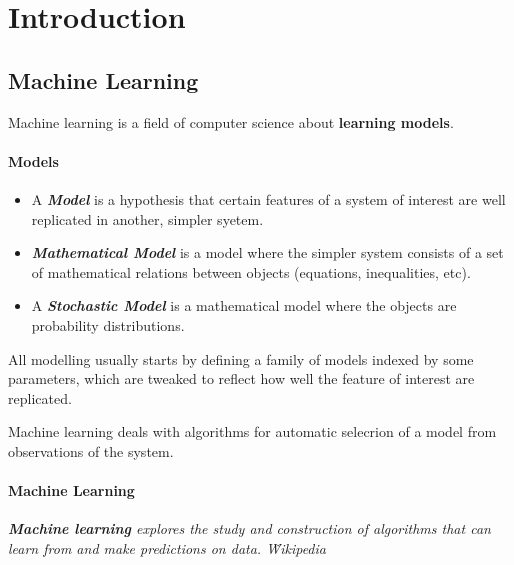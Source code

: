 
\chapter{Introduction}

\section{Machine Learning}

Machine learning is a field of computer science about \textbf{learning models}.

\subsubsection{Models}

\begin{definitionblock}[Model]
    \begin{itemize}
        \item A \textbf{\textit{Model}} is a hypothesis that certain features of a system of interest are well replicated in another, simpler syetem.
        
        \item \textbf{\textit{Mathematical Model}} is a model where the simpler system consists of a set of mathematical relations between objects (equations, inequalities, etc).
        
        \item A \textbf{\textit{Stochastic Model}} is a mathematical model where the objects are probability distributions.
    \end{itemize}
\end{definitionblock}

All modelling usually starts by defining a family of models indexed by some parameters, which are tweaked to reflect how well the feature of interest are replicated.

Machine learning deals with algorithms for automatic selecrion of a model from observations of the system.

\subsubsection{Machine Learning}

\begin{definitionblock}
\textit{\textbf{Machine learning} explores the study and construction of algorithms that can learn from and make predictions on data. \hfill \~ Wikipedia}
\end{definitionblock}

